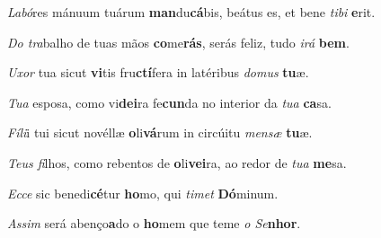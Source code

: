 \begin{greenumerate}
  \setcounter{enumi}{1}


  \item \textit{Labó}res mánuum tuárum \textbf{man}du\textbf{cá}bis, {\GreStar} beátus es, et bene \textit{tibi} \textbf{e}rit. 

  \switchcolumn\setcounter{enumi}{1}

  \item \textit{Do tra}balho de tuas mãos \textbf{co}me\textbf{rás}, {\GreStar} serás feliz, tudo \textit{irá} \textbf{bem}. 

  \switchcolumn*


  \item \textit{Uxor} tua sicut \textbf{vi}tis fru\textbf{ctí}fera {\GreStar} in latéribus \textit{domus} \textbf{tu}æ. 

  \switchcolumn%

  \item \textit{Tua} esposa, como vi\textbf{dei}ra fe\textbf{cun}da {\GreStar} no interior da \textit{tua} \textbf{ca}sa. 

  \switchcolumn*


  \item \textit{Fíli}i tui sicut novéllæ \textbf{o}li\textbf{vá}rum {\GreStar} in circúitu \textit{mensæ} \textbf{tu}æ. 

  \switchcolumn%

  \item \textit{Teus fi}lhos, como rebentos de \textbf{o}li\textbf{vei}ra, {\GreStar} ao redor de \textit{tua} \textbf{me}sa. 

  \switchcolumn*


  \item \textit{Ecce} sic benedi\textbf{cé}tur \textbf{ho}mo, {\GreStar} qui \textit{timet} \textbf{Dó}minum. 

  \switchcolumn%

  \item \textit{Assim} será abenço\textbf{a}do o \textbf{ho}mem {\GreStar} que teme \textit{o Se}\textbf{nhor}. 

  \switchcolumn*


\end{greenumerate}
